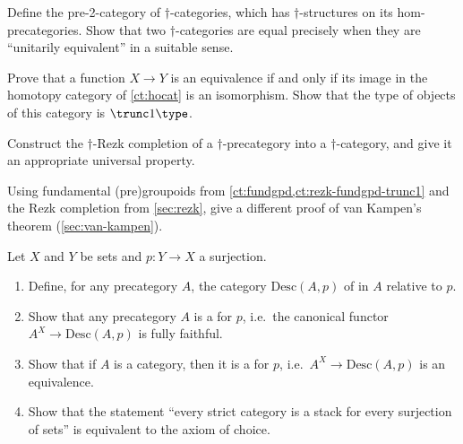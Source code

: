 \begin{ex}\label{ex:pre2dagger-cat}
  Define the pre-2-category of $\dagger$-categories, which has $\dagger$-struc\-tures on its hom-pre\-cat\-egories.
  Show that two $\dagger$-categories are equal precisely when they are ``unitarily equivalent'' in a suitable sense.
\end{ex}

\begin{ex}\label{ct:ex:hocat}
  Prove that a function $X\to Y$ is an equivalence if and only if its image in the homotopy category of \cref{ct:hocat} is an isomorphism.
  Show that the type of objects of this category is $\trunc1\type$.
\end{ex}

\begin{ex}\label{ex:dagger-rezk}
  Construct the $\dagger$-Rezk completion of a $\dagger$-precategory into a $\dagger$-category, and give it an appropriate universal property.
\end{ex}

\begin{ex}\label{ex:rezk-vankampen}
  Using fundamental (pre)groupoids from \cref{ct:fundgpd,ct:rezk-fundgpd-trunc1} and the Rezk completion from \cref{sec:rezk}, give a different proof of van Kampen's theorem (\cref{sec:van-kampen}).
\end{ex}

\begin{ex}\label{ex:stack}
  Let $X$ and $Y$ be sets and $p:Y\to X$ a surjection.
  \begin{enumerate}
  \item Define, for any precategory $A$, the category $\mathrm{Desc}(A,p)$ of 
    in $A$ relative to $p$.
  \item Show that any precategory $A$ is a 
    for $p$, i.e.\ the canonical functor $A^X \to \mathrm{Desc}(A,p)$ is fully faithful.
  \item Show that if $A$ is a category, then it is a 
    for $p$, i.e.\ $A^X \to \mathrm{Desc}(A,p)$ is an equivalence.
  \item Show that the statement ``every strict category is a stack for every surjection of sets'' is equivalent to the axiom of choice.
  \end{enumerate}
\end{ex}

